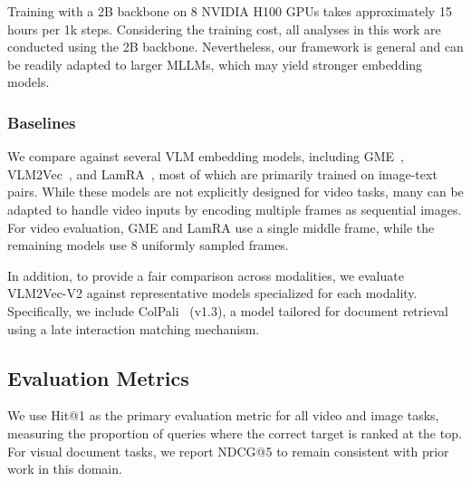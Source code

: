 Training \model with a 2B backbone on 8 NVIDIA H100 GPUs takes approximately 15 hours per 1k steps. Considering the training cost, all analyses in this work are conducted using the 2B backbone. Nevertheless, our framework is general and can be readily adapted to larger MLLMs, which may yield stronger embedding models.



\subsubsection{Baselines}


We compare against several VLM embedding models, including GME~\citep{gme}, VLM2Vec~\citep{vlm2vec}, and LamRA~\citep{lamra}, most of which are primarily trained on image-text pairs. While these models are not explicitly designed for video tasks, many can be adapted to handle video inputs by encoding multiple frames as sequential images. For video evaluation, GME and LamRA use a single middle frame, while the remaining models use 8 uniformly sampled frames.

In addition, to provide a fair comparison across modalities, we evaluate VLM2Vec-V2 against representative models specialized for each modality. Specifically, we include ColPali~\citep{colpali} (v1.3), a model tailored for document retrieval using a late interaction matching mechanism. 

\subsection{Evaluation Metrics}
We use Hit@1 as the primary evaluation metric for all video and image tasks, measuring the proportion of queries where the correct target is ranked at the top. For visual document tasks, we report NDCG@5 to remain consistent with prior work in this domain.


